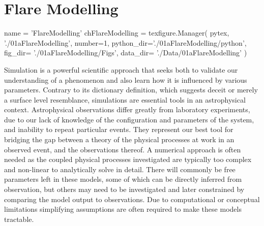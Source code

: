 \chapter{Flare Modelling}\label{Chap:FlareModelling}
\begin{pycode}[FlareModelling]
name = 'FlareModelling'
chFlareModelling = texfigure.Manager(
    pytex,
    './01aFlareModelling',
    number=1,
    python_dir='./01aFlareModelling/python',
    fig_dir=   './01aFlareModelling/Figs',
    data_dir=  './Data/01aFlareModelling'
)
\end{pycode}


Simulation is a powerful scientific approach that seeks both to validate our understanding of a phenomenon and also learn how it is influenced by various parameters.
Contrary to its dictionary definition, which suggests deceit or merely a surface level resemblance, simulations are essential tools in an astrophysical context.
Astrophysical observations differ greatly from laboratory experiments, due to our lack of knowledge of the configuration and parameters of the system, and inability to repeat particular events.
They represent our best tool for bridging the gap between a theory of the physical processes at work in an observed event, and the observations thereof.
A numerical approach is often needed as the coupled physical processes investigated are typically too complex and non-linear to analytically solve in detail.
There will commonly be free parameters left in these models, some of which can be directly inferred from observation, but others may need to be investigated and later constrained by comparing the model output to observations.
Due to computational or conceptual limitations simplifying assumptions are often required to make these models tractable.




